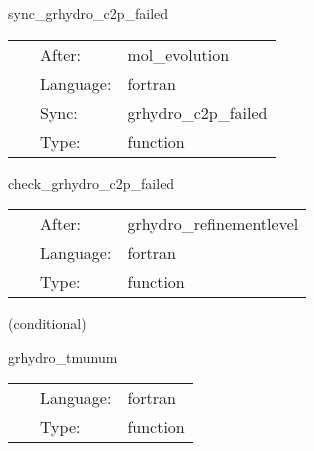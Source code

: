 \documentclass{article}
\begin{document}
\vspace{5mm}


\hspace{5mm} sync\_grhydro\_c2p\_failed 

\hspace{5mm}{\it syncronise the mask function that contains the points where c2p has failed } 


\hspace{5mm}

 \begin{tabular*}{160mm}{cll} 
~ & After:  & mol\_evolution \\ 
~ & Language:  & fortran \\ 
~ & Sync:  & grhydro\_c2p\_failed \\ 
~ & Type:  & function \\ 
\end{tabular*} 


\vspace{5mm}


\hspace{5mm} check\_grhydro\_c2p\_failed 

\hspace{5mm}{\it check the mask function that contains the points where c2p has failed and report an error in case a failure is found } 


\hspace{5mm}

 \begin{tabular*}{160mm}{cll} 
~ & After:  & grhydro\_refinementlevel \\ 
~ & Language:  & fortran \\ 
~ & Type:  & function \\ 
\end{tabular*} 


\vspace{5mm}

   (conditional) 

\hspace{5mm} grhydro\_tmunum 

\hspace{5mm}{\it compute the energy-momentum tensor - mhd version } 


\hspace{5mm}

 \begin{tabular*}{160mm}{cll} 
~ & Language:  & fortran \\ 
~ & Type:  & function \\ 
\end{tabular*} 
\end{document}
